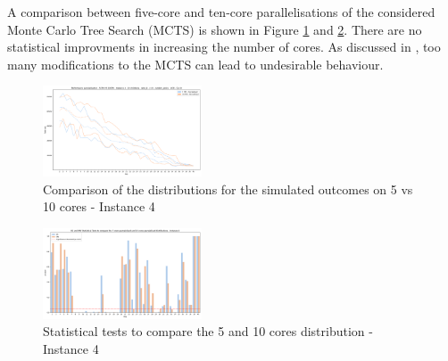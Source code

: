 \documentclass[conference]{IEEEtran}
\begin{document}
A comparison between five-core and ten-core parallelisations of the considered Monte Carlo Tree Search (MCTS) is shown in Figure \ref{fig:parralel (5 vs 10)} and \ref{fig:Stats test 5 VS 10 Parall}. There are no statistical improvments in increasing the number of cores. As discussed in \cite{different_selection_policies}, too many modifications to the MCTS can lead to undesirable behaviour.

\begin{figure}[!ht]
    \centering
    \includegraphics[width=0.42\textwidth]{Figures/4 - 5 CPU Paralelised vs 10 CPU paralelised.png}
    \caption{Comparison of the distributions for the simulated outcomes on 5 vs 10 cores - Instance 4}
    \label{fig:parralel (5 vs 10)}
\end{figure}


\begin{figure}[!ht]
    \centering
    \includegraphics[width=0.42\textwidth]{Figures/4 - Distribution stats tests 5P vs 10P.png}
    \caption{Statistical tests to compare the 5 and 10 cores distribution - Instance 4}
    \label{fig:Stats test 5 VS 10 Parall}
\end{figure}






\end{document}

